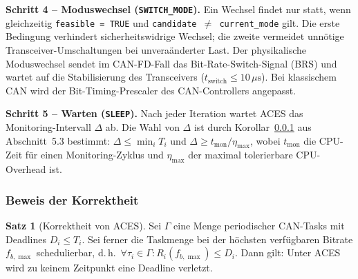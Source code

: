 ﻿\documentclass[a4paper,12pt]{article}
\theoremstyle{definition}
\newtheorem{satz}{Satz}
\begin{document}
\textbf{Schritt 4 -- Moduswechsel (\texttt{SWITCH\_MODE}).}
Ein Wechsel findet nur statt, wenn gleichzeitig \texttt{feasible = TRUE} und
\texttt{candidate $\neq$ current\_mode} gilt.
Die erste Bedingung verhindert sicherheitswidrige Wechsel; die zweite vermeidet
unn\"{o}tige Transceiver-Umschaltungen bei unvera\"{a}nderter Last.
Der physikalische Moduswechsel sendet im CAN-FD-Fall das Bit-Rate-Switch-Signal
(BRS) und wartet auf die Stabilisierung des Transceivers
($t_{\mathrm{switch}} \leq 10\,\mu\text{s}$).
Bei klassischem CAN wird der Bit-Timing-Prescaler des CAN-Controllers angepasst.

\textbf{Schritt 5 -- Warten (\texttt{SLEEP}).}
Nach jeder Iteration wartet ACES das Monitoring-Intervall $\Delta$ ab.
Die Wahl von $\Delta$ ist durch Korollar~\ref{} aus Abschnitt~5.3 bestimmt:
$\Delta \leq \min_i T_i$ und $\Delta \geq t_{\mathrm{mon}} / \eta_{\max}$,
wobei $t_{\mathrm{mon}}$ die CPU-Zeit f\"{u}r einen Monitoring-Zyklus und
$\eta_{\max}$ der maximal tolerierbare CPU-Overhead ist.

\subsubsection{Beweis der Korrektheit}

\begin{satz}[Korrektheit von ACES]
\label{satz:korrektheit}
Sei $\Gamma$ eine Menge periodischer CAN-Tasks mit Deadlines $D_i \leq T_i$.
Sei ferner die Taskmenge bei der h\"{o}chsten verf\"{u}gbaren Bitrate $f_{b,\max}$
schedulierbar, d.\,h.\ $\forall \tau_i \in \Gamma: R_i(f_{b,\max}) \leq D_i$.
Dann gilt: Unter ACES wird zu keinem Zeitpunkt eine Deadline verletzt.
\end{satz}
\end{document}
